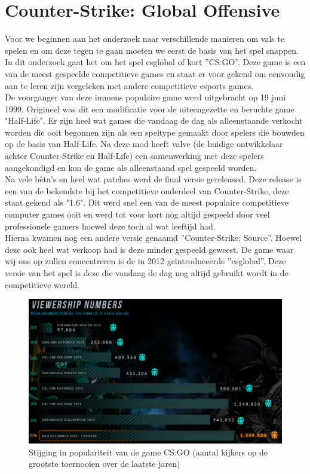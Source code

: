 \documentclass[pdftex,a4paper,12pt,twoside]{report}
\begin{document}
\chapter{Counter-Strike: Global Offensive}
\label{ch:csgo}
Voor we beginnen aan het onderzoek naar verschillende manieren om vals te spelen en om deze tegen te gaan moeten we eerst de basis van het spel snappen. In dit onderzoek gaat het om het spel \gls{csglobal} of kort ''CS:GO''. Deze game is een van de meest gespeelde competitieve games en staat er voor gekend om eenvoudig aan te leren zijn vergeleken met andere competitieve \gls{esports} games. 
\\

De voorganger van deze immens populaire game werd uitgebracht op 19 juni 1999. Origineel was dit een modificatie voor de uiteengezette en beruchte game "Half-Life". Er zijn heel wat games die vandaag de dag als alleenstaande verkocht worden die ooit begonnen zijn als een speltype gemaakt door spelers die bouwden op de basis van Half-Life. Na deze mod heeft \gls{valve} (de huidige ontwikkelaar achter Counter-Strike en Half-Life) een samenwerking met deze spelers aangekondigd en kon de game als alleenstaand spel gespeeld worden.
\\

Na vele bèta's en heel wat patches werd de final versie gereleased. Deze release is een van de bekendste bij het competitieve onderdeel van Counter-Strike, deze staat gekend als "1.6". Dit werd snel een van de meest populaire competitieve computer games ooit en werd tot voor kort nog altijd gespeeld door veel professionele gamers hoewel deze toch al wat leeftijd had.
\citep{dusttodust}
\\

Hierna kwamen nog een andere versie genaamd ''Counter-Strike: Source''. Hoewel deze ook heel wat verkoop had is deze minder gespeeld geweest. De game waar wij ons op zullen concentreren is de in 2012 geïntroduceerde ''\gls{csglobal}''. Deze versie van het spel is deze die vandaag de dag nog altijd gebruikt wordt in de competitieve wereld.

\begin{figure}[H]
\centering
\includegraphics[width=15cm]{img/dathostInfographic}
\caption{Stijging in populariteit van de game CS:GO (aantal kijkers op de grootste toernooien over de laatste jaren)}
\end{figure}
\end{document}
